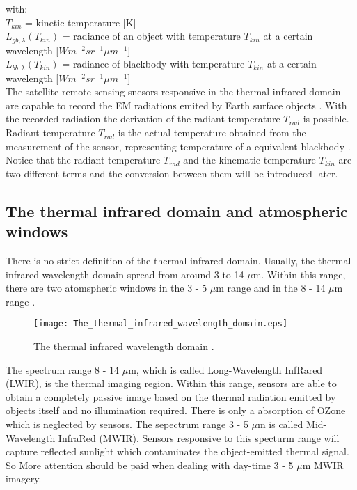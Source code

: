 \noindent with:\\
\indent $T_{kin}$ = kinetic temperature [K]\\
\indent $L_{gb, \lambda}(T_{kin})$ = radiance of an object with temperature $T_{kin}$ at a certain wavelength [$W m^{-2} sr^{-1} \mu m^{-1}$]\\
\indent $L_{bb, \lambda}(T_{kin})$ = radiance of blackbody with temperature $T_{kin}$ at a certain wavelength [$W m^{-2} sr^{-1} \mu m^{-1}$]\\

\noindent The satellite remote sensing snesors responsive in the thermal infrared domain are capable to record the EM radiations emited by Earth surface objects \parencite{Reference204}. With the recorded radiation the derivation of the radiant temperature $T_{rad}$ is possible. Radiant temperature $T_{rad}$ is the actual temperature obtained from the measurement of the sensor, representing temperature of a equivalent blackbody \parencite{Reference206}. Notice that the radiant temperature $T_{rad}$ and the kinematic temperature $T_{kin}$ are two different terms and the conversion between them will be introduced later.\\


\subsection{The thermal infrared domain and atmospheric windows}
There is no strict definition of the thermal infrared domain. Usually, the thermal infrared wavelength domain spread from around 3 to 14 $\mu$m. Within this range, there are two atomspheric windows in the 3 - 5 $\mu$m range and in the 8 - 14 $\mu$m range \parencite{Reference204}. \\

\begin{figure}[!htbp]
  \centering\texttt{[image: The\_thermal\_infrared\_wavelength\_domain.eps]}
  \caption{The thermal infrared wavelength domain \parencite{Reference204}.}
  \label{fig:TIRdomain}
\end{figure}

\noindent The spectrum range 8 - 14 $\mu$m, which is called Long-Wavelength InfRared (LWIR), is the thermal imaging region. Within this range, sensors are able to obtain a completely passive image based on the thermal radiation emitted by objects itself and no illumination required. There is only a absorption of OZone which is neglected by sensors. The sepectrum range 3 - 5 $\mu$m is called Mid-Wavelength InfraRed (MWIR). Sensors responsive to this specturm range will capture reflected sunlight which contaminates the object-emitted thermal signal. So More attention should be paid when dealing with day-time 3 - 5 $\mu$m MWIR imagery. \\

